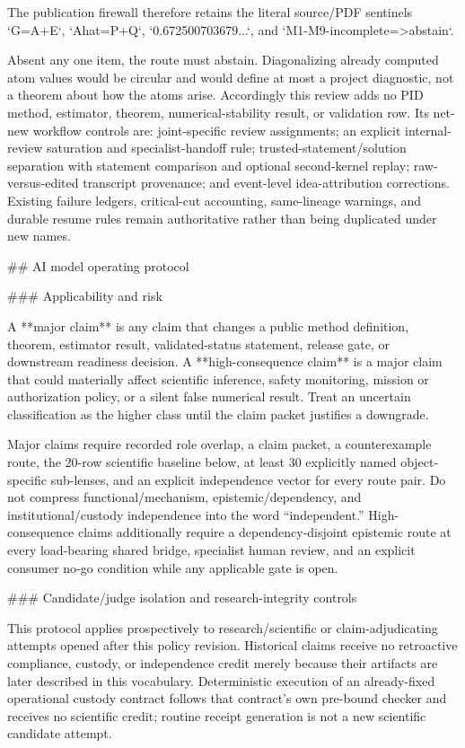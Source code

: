 \documentclass[11pt]{article}
\begin{document}
\begin{markdown}
The publication firewall therefore retains the literal source/PDF sentinels `G=A+E`,
`Ahat=P+Q`, `0.672500703679...`, and `M1-M9-incomplete=>abstain`.

Absent any one item, the route must abstain. Diagonalizing already computed atom values would be
circular and would define at most a project diagnostic, not a theorem about how the atoms arise.
Accordingly this review adds no PID method, estimator, theorem, numerical-stability result, or
validation row. Its net-new workflow controls are: joint-specific review assignments; an explicit
internal-review saturation and specialist-handoff rule; trusted-statement/solution separation with
statement comparison and optional second-kernel replay; raw-versus-edited transcript provenance;
and event-level idea-attribution corrections. Existing failure ledgers, critical-cut accounting,
same-lineage warnings, and durable resume rules remain authoritative rather than being duplicated
under new names.

## AI model operating protocol

### Applicability and risk

A **major claim** is any claim that changes a public method definition, theorem, estimator result,
validated-status statement, release gate, or downstream readiness decision. A
**high-consequence claim** is a major claim that could materially affect scientific inference,
safety monitoring, mission or authorization policy, or a silent false numerical result. Treat an
uncertain classification as the higher class until the claim packet justifies a downgrade.

Major claims require recorded role overlap, a claim packet, a counterexample route, the 20-row
scientific baseline below, at least 30 explicitly named object-specific sub-lenses, and an explicit
independence vector for every route pair. Do not compress functional/mechanism,
epistemic/dependency, and institutional/custody independence into the word “independent.”
High-consequence claims additionally require a dependency-disjoint epistemic route at every
load-bearing shared bridge, specialist human review, and an explicit consumer no-go condition
while any applicable gate is open.

### Candidate/judge isolation and research-integrity controls

This protocol applies prospectively to research/scientific or claim-adjudicating attempts opened
after this policy revision. Historical claims receive no retroactive compliance, custody, or
independence credit merely because their artifacts are later described in this vocabulary.
Deterministic execution of an already-fixed operational custody contract follows that contract's
own pre-bound checker and receives no scientific credit; routine receipt generation is not a new
scientific candidate attempt.


\end{markdown}
\end{document}
